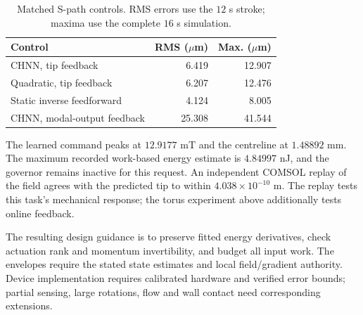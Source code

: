 \begin{table}[t]
\centering
\caption{Matched S-path controls. RMS errors use the $12$ s stroke; maxima use the complete $16$ s simulation.}
\label{tab:core-tracking}
\setlength{\tabcolsep}{3.5pt}
\begin{tabular}{lrr}
\toprule
Control & RMS ($\mu$m) & Max. ($\mu$m)\\
\midrule
CHNN, tip feedback & 6.419 & 12.907\\
Quadratic, tip feedback & 6.207 & 12.476\\
Static inverse feedforward & 4.124 & 8.005\\
CHNN, modal-output feedback & 25.308 & 41.544\\
\bottomrule
\end{tabular}
\end{table}

The learned command peaks at $12.9177$ mT and the centreline at $1.48892$ mm. The maximum recorded work-based energy estimate is $4.84997$ nJ, and the governor remains inactive for this request. An independent COMSOL replay of the field agrees with the predicted tip to within $4.038\times10^{-10}$ m. The replay tests this task's mechanical response; the torus experiment above additionally tests online feedback.

The resulting design guidance is to preserve fitted energy derivatives, check actuation rank and momentum invertibility, and budget all input work. The envelopes require the stated state estimates and local field/gradient authority. Device implementation requires calibrated hardware and verified error bounds; partial sensing, large rotations, flow and wall contact need corresponding extensions.
